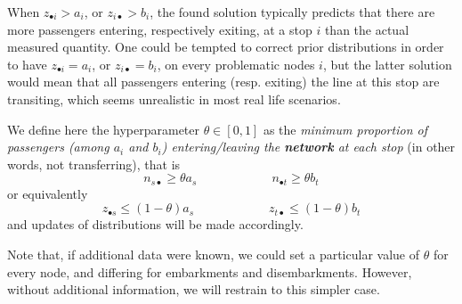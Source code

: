 \documentclass{bmcart}
\begin{document}
When $z_{\bullet i} > a_i$, or $z_{i \bullet} > b_i$, the found solution typically predicts that there are more passengers entering, respectively exiting, at a stop $i$ than the actual measured quantity. One could be tempted to correct prior distributions in order to have $z_{\bullet i} = a_i$, or $z_{i \bullet} = b_i$, on every problematic nodes $i$, but the latter solution would mean that all passengers entering (resp. exiting) the line at this stop are transiting, which seems unrealistic in most real life scenarios.

We define here the hyperparameter $ \theta\in [0, 1]$ as the \emph{minimum proportion of passengers (among $a_i$ and $b_i$) entering/leaving the \textbf{network} at each stop} (in other words, not transferring), that is
\begin{equation}
n_{s\bullet}\ge \theta a_s \qquad\qquad \qquad n_{\bullet t}\ge \theta b_t
\end{equation}
or equivalently 
\begin{equation}
	z_{\bullet s} \le (1 - \theta) a_s\qquad\qquad \qquad z_{t \bullet} \le  (1 - \theta) b_t
\end{equation}
and updates of distributions will be made accordingly.

Note that, if additional data were known, we could set a particular value of $\theta$ for every node, and differing for embarkments and disembarkments. However, without additional information, we will restrain to this simpler case. 
\end{document}
